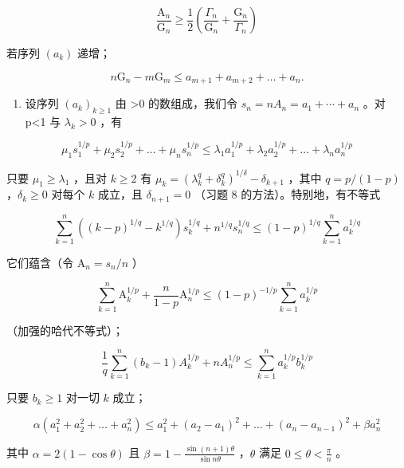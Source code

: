 \[
\frac {\mathrm{A} _ {n}}{\mathrm{G} _ {n}} \geqslant \frac {1}{2} \left(\frac {\Gamma_ {n}}{\mathrm{G} _ {n}} + \frac {\mathrm{G} _ {n}}{\Gamma_ {n}}\right)
\]

若序列 \((a_{k})\) 递增；

\[
n \mathrm{G} _ {n} - m \mathrm{G} _ {m} \leqslant a _ {m + 1} + a _ {m + 2} + \dots + a _ {n}.
\]

\begin{enumerate}
\def\labelenumi{\arabic{enumi})}
\setcounter{enumi}{9}
\tightlist
\item
  设序列 \((a_{k})_{k\geqslant1}\) 由 \textgreater0 的数组成，我们令 \(s_{n}=nA_{n}=a_{1}+\cdots+a_{n}\) 。对 p\textless1 与 \(\lambda_{k}>0\) ，有
\end{enumerate}

\[
\mu_ {1} s _ {1} ^ {1 / p} + \mu_ {2} s _ {2} ^ {1 / p} + \dots + \mu_ {n} s _ {n} ^ {1 / p} \leqslant \lambda_ {1} a _ {1} ^ {1 / p} + \lambda_ {2} a _ {2} ^ {1 / p} + \dots + \lambda_ {n} a _ {n} ^ {1 / p}
\]

只要 \(\mu_1 \geqslant \lambda_1\) ，且对 \(k \geqslant 2\) 有 \(\mu_k = \left( \lambda_k^q + \delta_k^q \right)^{1/\delta} - \delta_{k+1}\) ，其中 \(q = p/(1-p)\) ，\(\delta_k \geqslant 0\) 对每个 \(k\) 成立，且 \(\delta_{n+1} = 0\) （习题 8 的方法）。特别地，有不等式

\[
\sum_ {k = 1} ^ {n} \left((k - p) ^ {1 / q} - k ^ {1 / q}\right) s _ {k} ^ {1 / q} + n ^ {1 / q} s _ {n} ^ {1 / q} \leqslant (1 - p) ^ {1 / q} \sum_ {k = 1} ^ {n} a _ {k} ^ {1 / q}
\]

它们蕴含（令 \(\mathrm{A}_n = s_n / n\) ）

\[
\sum_ {k = 1} ^ {n} \mathrm{A} _ {k} ^ {1 / p} + \frac {n}{1 - p} \mathrm{A} _ {n} ^ {1 / p} \leqslant (1 - p) ^ {- 1 / p} \sum_ {k = 1} ^ {n} a _ {k} ^ {1 / p}
\]

（加强的哈代不等式）；

\[
\frac {1}{q} \sum_ {k = 1} ^ {n} \left(b _ {k} - 1\right) A _ {k} ^ {1 / p} + n A _ {n} ^ {1 / p} \leqslant \sum_ {k = 1} ^ {n} a _ {k} ^ {1 / p} b _ {k} ^ {1 / p}
\]

只要 \(b_{k} \geqslant 1\) 对一切 \(k\) 成立；

\[
\alpha \left(a _ {1} ^ {2} + a _ {2} ^ {2} + \dots + a _ {n} ^ {2}\right) \leqslant a _ {1} ^ {2} + \left(a _ {2} - a _ {1}\right) ^ {2} + \dots + \left(a _ {n} - a _ {n - 1}\right) ^ {2} + \beta a _ {n} ^ {2}
\]

其中 \(\alpha = 2(1 - \cos \theta)\) 且 \(\beta = 1 - \frac{\sin(n + 1)\theta}{\sin n\theta}\) ，\(\theta\) 满足 \(0\leqslant \theta < \frac{\pi}{n}\) 。

